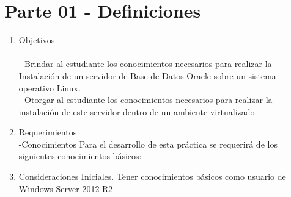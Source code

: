 \section{Parte 01 - Definiciones} 

\begin{enumerate}[1.]
	\item Objetivos
	\\\\- Brindar al estudiante los conocimientos necesarios para realizar la Instalación de un servidor de Base de Datos Oracle sobre un sistema operativo Linux.	
	\\- Otorgar al estudiante los conocimientos necesarios para realizar la instalación de este servidor dentro de un ambiente virtualizado.\\
	\item Requerimientos
	\\-Conocimientos
	\subitem Para el desarrollo de esta práctica se requerirá de los siguientes conocimientos básicos:

	\item Consideraciones Iniciales.
	\subitem Tener conocimientos b\'asicos como usuario de Windows Server 2012 R2

	
	

\end{enumerate} 
